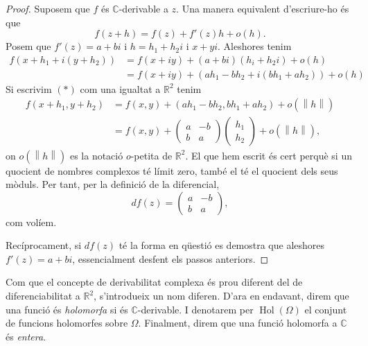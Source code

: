 \documentclass[12pt,twoside]{report}
\numberwithin{table}{section}
\numberwithin{equation}{section}
\numberwithin{figure}{section}
\newcommand{\R}{\ensuremath{\mathbb{R}}}
\newcommand{\C}{\ensuremath{\mathbb{C}}}
\newcommand{\norm}[1]{\left\lVert #1 \right\rVert}
\DeclareMathOperator{\Hol}{Hol}
\begin{document}
\begin{proof}
	Suposem que \( f \) és \( \C \)-derivable a \( z \). Una manera equivalent d'escriure-ho és que
	\begin{equation*}
		f(z + h) = f(z) + f'(z)h + o(h).
	\end{equation*}
	Posem que \( f'(z) = a + bi \) i \( h = h_1 + h_2i \) i \( x + yi \). Aleshores tenim
	\begin{align*}
		f(x + h_1 + i(y + h_2)) & = f(x + iy) + (a + bi)(h_i + h_2i) + o(h) \\
														& = f(x + iy) + (ah_1 - bh_2 + i(bh_1 + ah_2)) + o(h) \tag{\( \ast \)}
	\end{align*}
	Si escrivim \( (\ast) \) com una igualtat a \( \R^2 \) tenim
	\begin{align*}
		f(x + h_1, y + h_2) & = f(x,y) + (ah_1 - bh_2, bh_1 + ah_2) + o(\norm{h}) \\
												& = f(x,y) + \begin{pmatrix} a & -b \\ b & a \end{pmatrix} \begin{pmatrix}								h_1 \\ h_2 \end{pmatrix} + o(\norm{h}),
	\end{align*}
	on \( o(\norm{h}) \) es la notació \( o \)-petita de \( \R^2 \). El que hem escrit és cert perquè si un quocient de nombres complexos té límit zero, també el té el quocient dels seus mòduls. Per tant, per la definició de la diferencial,
	\begin{equation*}
		df(z) = \begin{pmatrix}
			a & -b \\
			b & a
		\end{pmatrix},
	\end{equation*}
	com volíem. 	

	Recíprocament, si \( df(z) \) té la forma en qüestió es demostra que aleshores \( f'(z) = a + bi \), essencialment desfent els passos anteriors.
\end{proof}

Com que el concepte de derivabilitat complexa és prou diferent del de diferenciabilitat a \( \R^2 \), s'introdueix un nom diferen. D'ara en endavant, direm que una funció és \emph{holomorfa} si és \( \C \)-derivable. I denotarem per \( \Hol{(\Omega)} \) el conjunt de funcions holomorfes sobre \( \Omega \). Finalment, direm que una funció holomorfa a \( \C \) és \emph{entera}.
\end{document}
